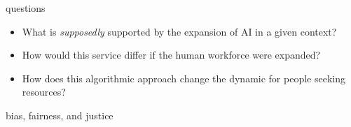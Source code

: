 \documentclass[aspectratio=43,17pt]{beamer} %
\begin{document}
\begin{frame}[plain]


\centering
{}


\end{frame}

\begin{frame}{questions}
\begin{itemize}
    \item What is \emph{supposedly} supported by the expansion of AI in a given context?
    \item How would this service differ if the human workforce were expanded?
    \item How does this algorithmic approach change the dynamic for people seeking resources?
\end{itemize}
\end{frame}






\begin{frame}[plain]


\end{frame}


\begin{frame}{bias, fairness, and justice}


\end{frame}
\end{document}
